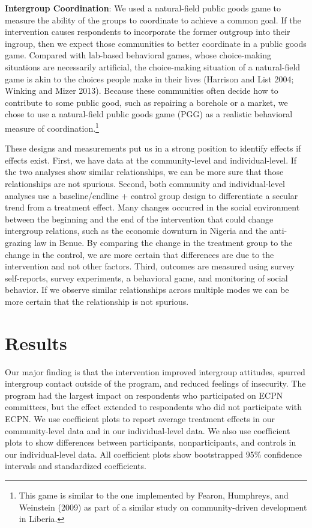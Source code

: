 \documentclass[11pt]{article}
\begin{document}
\textbf{Intergroup Coordination}: We used a natural-field public goods
game to measure the ability of the groups to coordinate to achieve a
common goal. If the intervention causes respondents to incorporate the
former outgroup into their ingroup, then we expect those communities to
better coordinate in a public goods game. Compared with lab-based
behavioral games, whose choice-making situations are necessarily
artificial, the choice-making situation of a natural-field game is akin
to the choices people make in their lives (Harrison and List 2004;
Winking and Mizer 2013). Because these communities often decide how to
contribute to some public good, such as repairing a borehole or a
market, we chose to use a natural-field public goods game (PGG) as a
realistic behavioral measure of coordination.\footnote{This game is
  similar to the one implemented by Fearon, Humphreys, and Weinstein
  (2009) as part of a similar study on community-driven development in
  Liberia.}

These designs and measurements put us in a strong position to identify
effects if effects exist. First, we have data at the community-level and
individual-level. If the two analyses show similar relationships, we can
be more sure that those relationships are not spurious. Second, both
community and individual-level analyses use a baseline/endline + control
group design to differentiate a secular trend from a treatment effect.
Many changes occurred in the social environment between the beginning
and the end of the intervention that could change intergroup relations,
such as the economic downturn in Nigeria and the anti-grazing law in
Benue. By comparing the change in the treatment group to the change in
the control, we are more certain that differences are due to the
intervention and not other factors. Third, outcomes are measured using
survey self-reports, survey experiments, a behavioral game, and
monitoring of social behavior. If we observe similar relationships
across multiple modes we can be more certain that the relationship is
not spurious.

\hypertarget{results}{%
\section{Results}\label{results}}

Our major finding is that the intervention improved intergroup
attitudes, spurred intergroup contact outside of the program, and
reduced feelings of insecurity. The program had the largest impact on
respondents who participated on ECPN committees, but the effect extended
to respondents who did not participate with ECPN. We use coefficient
plots to report average treatment effects in our community-level data
and in our individual-level data. We also use coefficient plots to show
differences between participants, nonparticipants, and controls in our
individual-level data. All coefficient plots show bootstrapped 95\%
confidence intervals and standardized coefficients.
\end{document}
